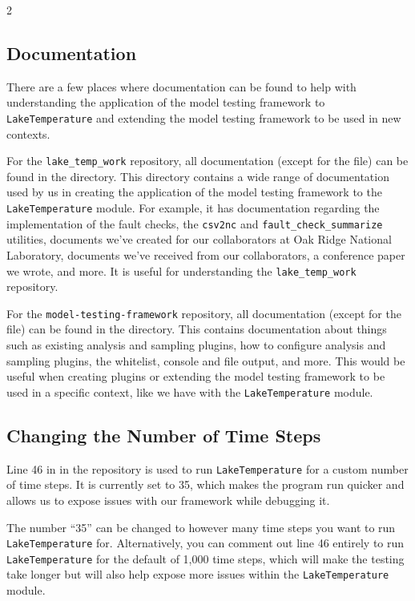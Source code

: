 \documentclass[10pt]{article}
\begin{document}
\begin{multicols}{2}

\subsection{Documentation}
There are a few places where documentation can be found to help with understanding the application of the model testing framework to \verb|LakeTemperature| and extending the model testing framework to be used in new contexts. 

For the \verb|lake_temp_work| repository, all documentation (except for the  file) can be found in the  directory. This directory contains a wide range of documentation used by us in creating the application of the model testing framework to the \verb|LakeTemperature| module. For example, it has documentation regarding the implementation of the fault checks, the \verb|csv2nc| and \verb|fault_check_summarize| utilities, documents we've created for our collaborators at Oak Ridge National Laboratory, documents we've received from our collaborators, a conference paper we wrote, and more. It is useful for understanding the \verb|lake_temp_work| repository. 

For the \verb|model-testing-framework| repository, all documentation (except for the  file) can be found in the  directory. This contains documentation about things such as existing analysis and sampling plugins, how to configure analysis and sampling plugins, the whitelist, console and file output, and more. This would be useful when creating plugins or extending the model testing framework to be used in a specific context, like we have with the \verb|LakeTemperature| module. 

\subsection{Changing the Number of Time Steps}
Line 46 in  in the repository is used to run \verb|LakeTemperature| for a custom number of time steps. It is currently set to 35, which makes the program run quicker and allows us to expose issues with our framework while debugging it. 

The number ``35'' can be changed to however many time steps you want to run \verb|LakeTemperature| for. Alternatively, you can comment out line 46 entirely to run \verb|LakeTemperature| for the default of 1,000 time steps, which will make the testing take longer but will also help expose more issues within the \verb|LakeTemperature| module. 


\end{multicols}
\end{document}
